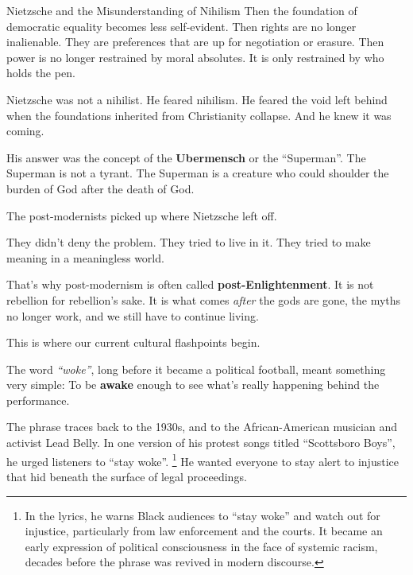 \begin{HistoricalSidebar}{Nietzsche and the Misunderstanding of Nihilism}
  Then the foundation of democratic equality becomes less self-evident.  
  Then rights are no longer inalienable. They are preferences that are up for negotiation or erasure.  
  Then power is no longer restrained by moral absolutes. It is only restrained by who holds the pen.
  
  \medskip
  
  Nietzsche was not a nihilist.  
  He feared nihilism. He feared the void left behind when the foundations inherited from Christianity collapse.  
  And he knew it was coming.

  \medskip
  
  His answer was the concept of the \textbf{Ubermensch} or the ``Superman''. 
  The Superman is not a tyrant. 
  The Superman is a creature who could shoulder the burden of God after the death of God.

  \medskip
  
  The post-modernists picked up where Nietzsche left off.

  \medskip
  
  They didn’t deny the problem.  
  They tried to live in it. 
  They tried to make meaning in a meaningless world.

  \medskip
  
  That’s why post-modernism is often called \textbf{post-Enlightenment}.  
  It is not rebellion for rebellion’s sake.  
  It is what comes \textit{after} the gods are gone, the myths no longer work, and we still have to 
  continue living.
  
\end{HistoricalSidebar}

\medskip

This is where our current cultural flashpoints begin.

The word \textit{``woke''}, long before it became a political football, meant something very simple:  
To be \textbf{awake} enough to see what’s really happening behind the performance.

The phrase traces back to the 1930s, and to the African-American musician and activist Lead Belly.  
In one version of his protest songs titled ``Scottsboro Boys'',
he urged listeners to ``stay woke''. \footnote{In the lyrics, he warns Black audiences to “stay woke” and 
watch out for injustice, particularly from law enforcement and the courts. It became an early expression of 
political consciousness in the face of systemic racism, 
decades before the phrase was revived in modern discourse.}
He wanted everyone to stay alert to injustice that hid beneath the 
surface of legal proceedings.

